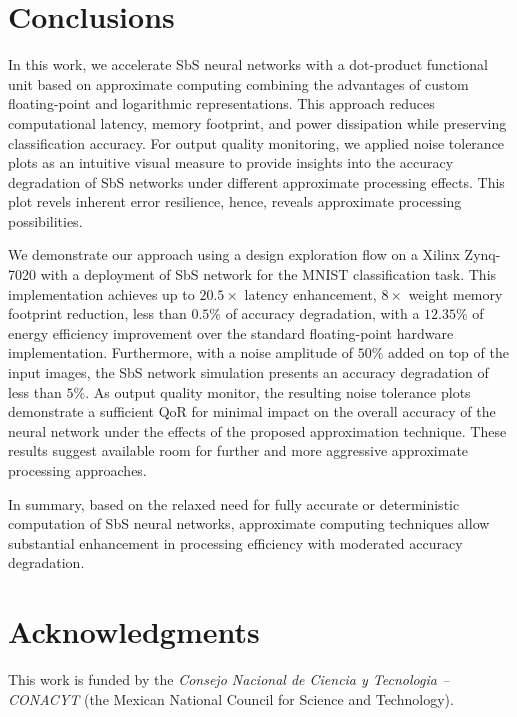 \section{Conclusions}
\label{sec:conclusions}
In this work, we accelerate SbS neural networks with a dot-product functional unit based on approximate computing combining the advantages of custom floating-point and logarithmic representations. This approach reduces computational latency, memory footprint, and power dissipation while preserving classification accuracy. For output quality monitoring, we applied noise tolerance plots as an intuitive visual measure to provide insights into the accuracy degradation of SbS networks under different approximate processing effects. This plot revels inherent error resilience, hence, reveals approximate processing possibilities.


We demonstrate our approach using a design exploration flow on a Xilinx Zynq-7020 with a deployment of SbS network for the MNIST classification task. This implementation achieves up to $20.5\times$ latency enhancement, $8\times$ weight memory footprint reduction, less than $0.5\%$ of accuracy degradation, with a $12.35\%$ of energy efficiency improvement over the standard floating-point hardware implementation. Furthermore, with a noise amplitude of $50\%$ added on top of the input images, the SbS network simulation presents an accuracy degradation of less than $5\%$. As output quality monitor, the resulting noise tolerance plots demonstrate a sufficient QoR for minimal impact on the overall accuracy of the neural network under the effects of the proposed approximation technique. These results suggest available room for further and more aggressive approximate processing approaches.


In summary, based on the relaxed need for fully accurate or deterministic computation of SbS neural networks, approximate computing techniques allow substantial enhancement in processing efficiency with moderated accuracy degradation.

\section * {Acknowledgments}\label{sec:Ack}
This work is funded by the \textit{Consejo Nacional de Ciencia y Tecnologia -- CONACYT} (the Mexican National Council for Science and Technology).
